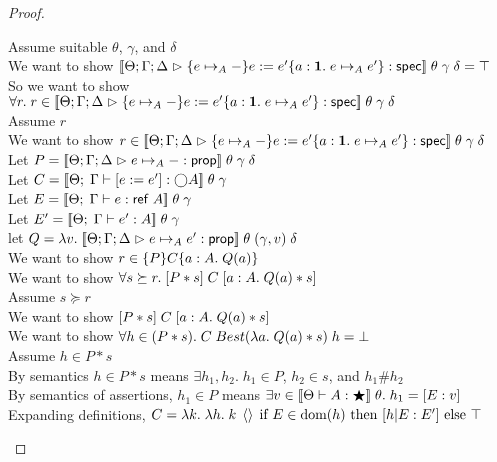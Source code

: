 \begin{proof}
  \begin{tabbedproof}
    \oo Assume suitable $\theta$, $\gamma$, and $\delta$ \\
    \ooo We want to show $\interp{\judgeS{\spec{e \pointsto_A -}{e := e'}{a:\unittype}{e \pointsto_A e'}}}\;\theta\;\gamma\;\delta = \top$ \\
    \ooo So we want to show $\forall r.\; r \in \interp{\judgeS{\spec{e \pointsto_A -}{e := e'}{a:\unittype}{e \pointsto_A e'}}}\;\theta\;\gamma\;\delta$ \\
    \ooo Assume $r$ \\
    \oooo We want to show $r \in \interp{\judgeS{\spec{e \pointsto_A -}{e := e'}{a:\unittype}{e \pointsto_A e'}}}\;\theta\;\gamma\;\delta$ \\
    \oooo Let $P = \interp{\judgeA{e \pointsto_A -}{\assert}}\;\theta\;\gamma\;\delta$ \\
    \oooo Let $C = \interp{\judgeE[\Theta]{\Gamma}{\comp{e := e'}}{\monad{A}}}\;\theta\;\gamma$ \\
    \oooo Let $E = \interp{\judgeE[\Theta]{\Gamma}{e}{\reftype{A}}}\;\theta\;\gamma$ \\
    \oooo Let $E' = \interp{\judgeE[\Theta]{\Gamma}{e'}{A}}\;\theta\;\gamma$ \\
    \oooo let $Q = \semfun{v}{\interp{\judgeA{e \pointsto_A e'}{\assert}}\;\theta\;(\gamma, v)\;\delta}$ \\
    \oooo We want to show $r \in \spec{P}{C}{a:A}{Q(a)}$ \\
    \oooo We want to show $\forall s \succeq r.\; \basicspec{P * s}{C}{a:A}{Q(a) * s}$ \\
    \oooo Assume $s \succeq r$ \\
    \ooooo We want to show $\basicspec{P * s}{C}{a:A}{Q(a) * s}$ \\
    \ooooo We want to show $\forall h \in (P * s).\; C\;Best(\semfun{a}{Q(a) * s})\;h = \bot$ \\
    \ooooo Assume $h \in P * s$ \\
    \oooooo By semantics $h \in P * s$ means $\exists h_1, h_2.\; h_1 \in P$, $h_2 \in s$, and
            $h_1 \# h_2$ \\
    \oooooo By semantics of assertions, $h_1 \in P$ means 
            $\exists v \in \interp{\judgeWK[\Theta]{A}{\bigstar}}\;\theta.\;
               h_1 = [E:v]$ \\
    \oooooo Expanding definitions, 
             $C = \semfun{k}{\semfun{h}{k\;\unit\;\mbox{if } E\in\domain{h} \mbox{ then } [h|E:E'] \mbox{ else }\top}}$ \\

\end{tabbedproof}
\end{proof}

